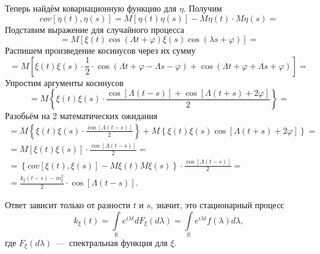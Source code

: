 Теперь найдём ковариационную функцию для $ \eta $.
Получим
\begin{equation*}
  cov \left[ \eta \left( t \right), \eta \left( s \right) \right] =
  M \left[ \eta \left( t \right) \eta \left( s \right) \right] -
  M \eta \left( t \right) \cdot M \eta \left( s \right) =
\end{equation*}
Подставим выражение для случайного процесса
\begin{equation*}
  = M \left[
    \xi \left( t \right) \cos \left( \Lambda t + \varphi \right)
    \xi \left( s \right) \cos \left( \lambda s + \varphi \right) \right] =
\end{equation*}
Распишем произведение косинусов через их сумму
\begin{equation*}
  = M \left[
    \xi \left( t \right) \xi \left( s \right) \cdot \frac{1}{2} \cdot
    \cos \left( \Lambda t + \varphi - \Lambda s - \varphi \right) +
    \cos \left( \Lambda t + \varphi + \Lambda s + \varphi \right) \right] =
\end{equation*}
Упростим аргументы косинусов
\begin{equation*}
  = M \left\{
    \xi \left( t \right) \xi \left( s \right) \cdot
    \frac{ \cos \left[ \Lambda \left( t - s \right) \right] + \cos \left[ \Lambda \left( t + s \right) + 2 \varphi \right] }{2} \right\} =
\end{equation*}
Разобьём на 2 математических ожидания
\begin{gather*}
  = M \left\{
    \xi \left( t \right) \xi \left( s \right) \cdot
    \frac{ \cos \left[ \Lambda \left( t - s \right) \right] }{2} \right\} +
  M \left\{
    \xi \left( t \right) \xi \left( s \right)
    \cos \left[ \Lambda \left( t + s \right) + 2 \varphi \right] \right\} = \\
  = M \left[ \xi \left( t \right) \xi \left( s \right) \right] \cdot
  \frac{ \cos \left[ \Lambda \left( t - s \right) \right] }{2} = \\
  = \left\{
    cov \left[ \xi \left( t \right), \xi \left( s \right) \right] -
    M \xi \left( t \right) M \xi \left( s \right)
  \right\} \cdot \frac{ \cos \left[ \Lambda \left( t - s \right) \right] }{2} = \\
  = \frac{k_{ \xi } \left( t - s \right) - m_{ \xi }^2}{2} \cdot
  \cos \left[ \Lambda \left( t - s \right) \right].
\end{gather*}

Ответ зависит только от разности $t$ и $s$, значит, это стационарный процесс
\begin{equation*}
  k_{ \xi } \left( t \right) =
  \int \limits_{ \mathbb{R}} e^{i \lambda t} dF_{ \xi } \left( d \lambda \right) =
  \int \limits_{ \mathbb{R}} e^{i \lambda t} f \left( \lambda \right) d \lambda,
\end{equation*}
где $F_{ \xi } \left( d \lambda \right) $~---~спектральная функция для $ \xi $.

